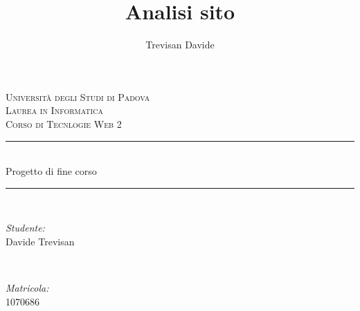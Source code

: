 \documentclass[12pt]{article}
\title{Analisi sito}
\date{}
\author{Trevisan Davide}
\begin{document}



\begin{titlepage}

\newcommand{\HRule}{\rule{\linewidth}{0.5mm}} %

\center %
 

\textsc{\LARGE Università degli Studi di Padova}\\[1.5cm] %
\textsc{\Large Laurea in Informatica}\\[0.5cm] %
\textsc{\large Corso di Tecnlogie Web 2}\\[0.5cm] %


\HRule \\[0.4cm]
{ \huge  Progetto di fine corso}\\[0.3cm] %
\HRule \\[1.5cm]
 

\begin{minipage}{0.4\textwidth}
\begin{flushleft} \large
\emph{Studente:}\\
Davide Trevisan %
\end{flushleft}
\end{minipage}
~
\begin{minipage}{0.4\textwidth}
\begin{flushright} \large
\emph{Matricola:} \\
\textsc{1070686} %
\end{flushright}
\end{minipage}\\[1cm]


\end{titlepage}
\end{document}

